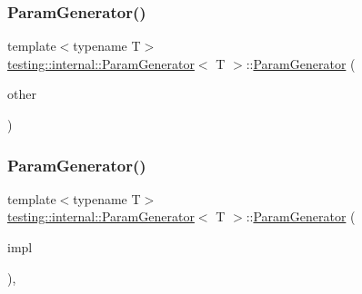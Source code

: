 \subsubsection{\texorpdfstring{ParamGenerator()}{ParamGenerator()}\hspace{0.1cm}{\footnotesize\ttfamily [4/6]}}
{\footnotesize\ttfamily template$<$typename T$>$ \\
\mbox{\hyperlink{classtesting_1_1internal_1_1_param_generator}{testing\+::internal\+::\+Param\+Generator}}$<$ T $>$\+::\mbox{\hyperlink{classtesting_1_1internal_1_1_param_generator}{Param\+Generator}} (\begin{DoxyParamCaption}\item[{const \mbox{\hyperlink{classtesting_1_1internal_1_1_param_generator}{Param\+Generator}}$<$ T $>$ \&}]{other }\end{DoxyParamCaption})\hspace{0.3cm}{\ttfamily [inline]}}

\mbox{\label{classtesting_1_1internal_1_1_param_generator_a6b017d4d030927714d495ee95ae92fbc}} 
\subsubsection{\texorpdfstring{ParamGenerator()}{ParamGenerator()}\hspace{0.1cm}{\footnotesize\ttfamily [5/6]}}
{\footnotesize\ttfamily template$<$typename T$>$ \\
\mbox{\hyperlink{classtesting_1_1internal_1_1_param_generator}{testing\+::internal\+::\+Param\+Generator}}$<$ T $>$\+::\mbox{\hyperlink{classtesting_1_1internal_1_1_param_generator}{Param\+Generator}} (\begin{DoxyParamCaption}\item[{\mbox{\hyperlink{classtesting_1_1internal_1_1_param_generator_interface}{Param\+Generator\+Interface}}$<$ T $>$ $\ast$}]{impl }\end{DoxyParamCaption})\hspace{0.3cm}{\ttfamily [inline]}, {\ttfamily [explicit]}}

\mbox{\label{classtesting_1_1internal_1_1_param_generator_a5891d25c31919b3099489f8bbcd58b5e}} 
